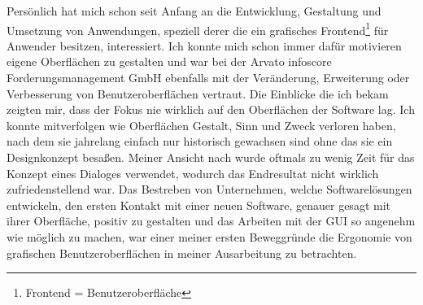Persönlich hat mich schon seit Anfang an die Entwicklung, Gestaltung und Umsetzung von Anwendungen, speziell derer die ein grafisches Frontend\footnote{Frontend = Benutzeroberfläche} für Anwender besitzen, interessiert. Ich konnte mich schon immer dafür motivieren eigene Oberflächen zu gestalten und war bei der Arvato infoscore Forderungsmanagement GmbH ebenfalls mit der Veränderung, Erweiterung oder Verbesserung von Benutzeroberflächen vertraut. Die Einblicke die ich bekam zeigten mir, dass der Fokus nie wirklich auf den Oberflächen der Software lag. Ich konnte mitverfolgen wie Oberflächen Gestalt, Sinn und Zweck verloren haben, nach dem sie jahrelang einfach nur historisch gewachsen sind ohne das sie ein Designkonzept besaßen. Meiner Ansicht nach wurde oftmals zu wenig Zeit für das Konzept eines Dialoges verwendet, wodurch das Endresultat nicht wirklich zufriedenstellend war. Das Bestreben von Unternehmen, welche Softwarelösungen entwickeln, den ersten Kontakt mit einer neuen Software, genauer gesagt mit ihrer Oberfläche, positiv zu gestalten und das Arbeiten mit der \gls{GUI} so angenehm wie möglich zu machen, war einer meiner ersten Beweggründe die Ergonomie von grafischen Benutzeroberflächen in meiner Ausarbeitung zu betrachten. 

